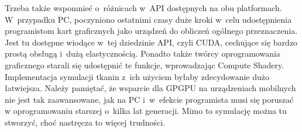 	Trzeba także wspomnieć o~różnicach w~API dostępnych na obu platformach. W~przypadku PC, poczyniono ostatnimi czasy duże kroki w~celu udostępnienia programistom kart graficznych jako urządzeń do obliczeń ogólnego przeznaczenia. Jest tu dostępne wiodące w~tej dziedzinie API, czyli CUDA, cechujące się bardzo prostą obsługą i~dużą elastycznością. Ponadto także twórcy oprogramowania graficznego starali się udostępnić te funkcje, wprowadzając Compute Shadery. Implementacja symulacji tkanin z~ich użyciem byłaby zdecydowanie dużo łatwiejsza. Należy pamiętać, że wsparcie dla GPGPU na urządzeniach mobilnych nie jest tak zaawansowane, jak na PC i~w~efekcie programista musi się poruszać w oprogramowaniu starszej o~kilka lat generacji. Mimo to symulację można tu stworzyć, choć nastręcza to więcej trudności.
	
	
	
	
	
	

